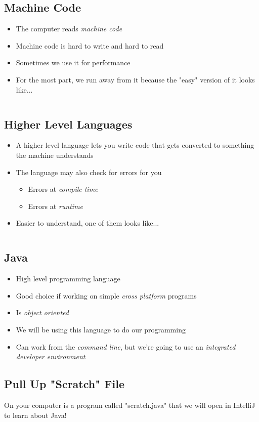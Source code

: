 \documentclass[
paper=128mm:96mm,
fontsize=12pt,
pagesize,
parskip=half-,
]{scrartcl}
\newcommand{\slide}[1]{#1 \clearpage}
\newcommand{\subsectionslide}[2]{\vspace*{1em}\slide{\subsection{#1} #2}}
\begin{document}
	\subsectionslide{Machine Code}
	{
		\begin{itemize}
			\item The computer reads \textit{machine code}
			\item Machine code is hard to write and hard to read
			\item Sometimes we use it for performance
			\item For the most part, we run away from it because the "easy" version of it looks like...
		\end{itemize}	
	}
	
	\slide
	{
		\begin{footnotesize}
		\inputminted{nasm}{code-snippets/helloworld.nasm}
		\end{footnotesize}

	}
	
	\subsectionslide{Higher Level Languages}
	{
		\begin{itemize}
			\item A higher level language lets you write code that gets converted to something the machine understands
			\item The language may also check for errors for you
			\begin{itemize}
				\item Errors at \textit{compile time}
				\item Errors at \textit{runtime}
			\end{itemize}
			\item Easier to understand, one of them looks like...
		\end{itemize}
	}

	\slide
	{
		\vspace*{2em}
		\inputminted{java}{code-snippets/helloworld.java}
	}
	
	\subsectionslide{Java}
	{
		\begin{itemize}
			\item High level programming language
			\item Good choice if working on simple \textit{cross platform} programs
			\item Is \textit{object oriented}
			\item We will be using this language to do our programming
			\item Can work from the \textit{command line}, but we're going to use an \textit{integrated developer environment}
		\end{itemize}
	}
	
	\subsectionslide{Pull Up "Scratch" File}
	{
		On your computer is a program called "scratch.java" that we will open in IntelliJ to learn about Java!
	}
	
\end{document}
